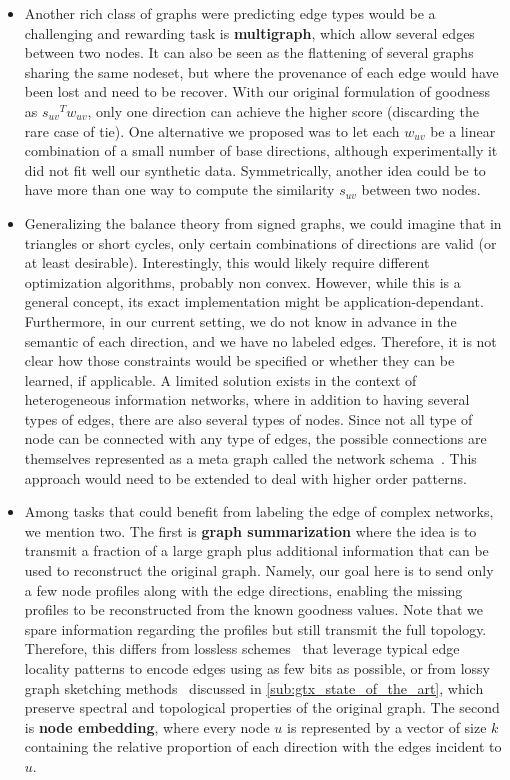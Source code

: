 \begin{itemize}[leftmargin=*]
  \item Another rich class of graphs were predicting edge types would be a challenging and rewarding
    task is \textbf{multigraph}, which allow several edges between two nodes. It can also be seen as
    the flattening of several graphs sharing the same nodeset, but where the provenance of each edge
    would have been lost and need to be recover. With our original formulation of goodness as
    ${s_{uv}}^T w_{uv}$, only one direction can achieve the higher score (discarding the rare case
    of tie). One alternative we proposed was to let each $w_{uv}$ be a linear combination of a small
    number of base directions, although experimentally it did not fit well our synthetic data.
    Symmetrically, another idea could be to have more than one way to compute the similarity
    $s_{uv}$ between two nodes.

  \item Generalizing the balance theory from signed graphs, we could imagine that in triangles or
    short cycles, only certain combinations of directions are valid (or at least desirable).
    Interestingly, this would likely require different optimization algorithms, probably non convex.
    However, while this is a general concept, its exact implementation might be
    application-dependant. Furthermore, in our current setting, we do not know in advance in the
    semantic of each direction, and we have no labeled edges. Therefore, it is not clear how those
    constraints would be specified or whether they can be learned, if applicable. A limited solution
    exists in the context of heterogeneous information networks, where in addition to having several
    types of edges, there are also several types of nodes. Since not all type of node can be
    connected with any type of edges, the possible connections are themselves represented as a meta
    graph called the network schema~\autocite[Definition 3]{HINSurvey17}. This approach would need
    to be extended to deal with higher order patterns.

  \item Among tasks that could benefit from labeling the edge of complex networks, we mention two.
    The first is \textbf{graph summarization} where the idea is to transmit a fraction of a large
    graph plus additional information that can be used to reconstruct the original graph. Namely,
    our goal here is to send only a few node profiles along with the edge directions, enabling the
    missing profiles to be reconstructed from the known goodness values. Note that we spare
    information regarding the profiles but still transmit the full topology. Therefore, this differs
    from lossless schemes~\autocites{compressSN09}{compressSN12} that leverage typical edge locality
    patterns to encode edges using as few bits as possible, or from lossy graph sketching
    methods~\autocite{graphSketch12} discussed in \autoref{sub:gtx_state_of_the_art}, which preserve
    spectral and topological properties of the original graph.
    The second is \textbf{node embedding}, where every node $u$ is represented by a vector of size
    $k$ containing the relative proportion of each direction with the edges incident to $u$.
\end{itemize}
